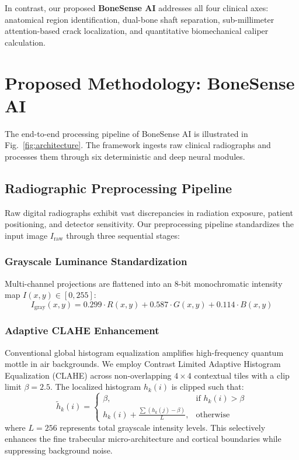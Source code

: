 \documentclass[journal]{IEEEtran}
\begin{document}
In contrast, our proposed \textbf{BoneSense AI} addresses all four clinical axes: anatomical region identification, dual-bone shaft separation, sub-millimeter attention-based crack localization, and quantitative biomechanical caliper calculation.

\section{Proposed Methodology: BoneSense AI}

The end-to-end processing pipeline of BoneSense AI is illustrated in Fig.~\ref{fig:architecture}. The framework ingests raw clinical radiographs and processes them through six deterministic and deep neural modules.

\subsection{Radiographic Preprocessing Pipeline}
Raw digital radiographs exhibit vast discrepancies in radiation exposure, patient positioning, and detector sensitivity. Our preprocessing pipeline standardizes the input image $I_{\text{raw}}$ through three sequential stages:

\subsubsection{Grayscale Luminance Standardization}
Multi-channel projections are flattened into an 8-bit monochromatic intensity map $I(x, y) \in [0, 255]$:
\begin{equation}
    I_{\text{gray}}(x, y) = 0.299 \cdot R(x,y) + 0.587 \cdot G(x,y) + 0.114 \cdot B(x,y)
\end{equation}

\subsubsection{Adaptive CLAHE Enhancement}
Conventional global histogram equalization amplifies high-frequency quantum mottle in air backgrounds. We employ Contrast Limited Adaptive Histogram Equalization (CLAHE) across non-overlapping $4 \times 4$ contextual tiles with a clip limit $\beta = 2.5$. The localized histogram $h_k(i)$ is clipped such that:
\begin{equation}
    \tilde{h}_k(i) = \begin{cases} 
      \beta, & \text{if } h_k(i) > \beta \\
      h_k(i) + \frac{\sum (h_k(j) - \beta)}{L}, & \text{otherwise}
   \end{cases}
\end{equation}
where $L=256$ represents total grayscale intensity levels. This selectively enhances the fine trabecular micro-architecture and cortical boundaries while suppressing background noise.
\end{document}
